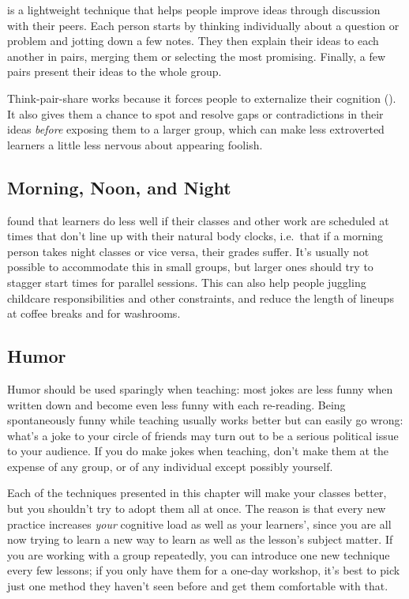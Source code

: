  is a lightweight technique
that helps people improve ideas
through discussion with their peers.
Each person starts by thinking individually about a question or problem
and jotting down a few notes.
They then explain their ideas to each another in pairs,
merging them or selecting the most promising.
Finally,
a few pairs present their ideas to the whole group.

Think-pair-share works because it forces people to externalize their cognition
().
It also gives them a chance to spot and resolve gaps or contradictions in their ideas
\emph{before} exposing them to a larger group,
which can make less extroverted learners a little less nervous
about appearing foolish.

\subsection*{Morning, Noon, and Night}

\cite{Smar2018} found that
learners do less well
if their classes and other work are scheduled at times that don't line up with their natural body clocks,
i.e.\ that if a morning person takes night classes or vice versa,
their grades suffer.
It's usually not possible to accommodate this in small groups,
but larger ones should try to stagger start times for parallel sessions.
This can also help people juggling childcare responsibilities and other constraints,
and reduce the length of lineups at coffee breaks and for washrooms.

\subsection*{Humor}

Humor should be used sparingly when teaching:
most jokes are less funny when written down
and become even less funny with each re-reading.
Being spontaneously funny while teaching usually works better
but can easily go wrong:
what's a joke to your circle of friends
may turn out to be a serious political issue to your audience.
If you do make jokes when teaching,
don't make them at the expense of any group,
or of any individual except possibly yourself.


Each of the techniques presented in this chapter will make your classes better,
but you shouldn't try to adopt them all at once.
The reason is that every new practice increases \emph{your} cognitive load as well as your learners',
since you are all now trying to learn a new way to learn
as well as the lesson's subject matter.
If you are working with a group repeatedly,
you can introduce one new technique every few lessons;
if you only have them for a one-day workshop,
it's best to pick just one method they haven't seen before
and get them comfortable with that.

